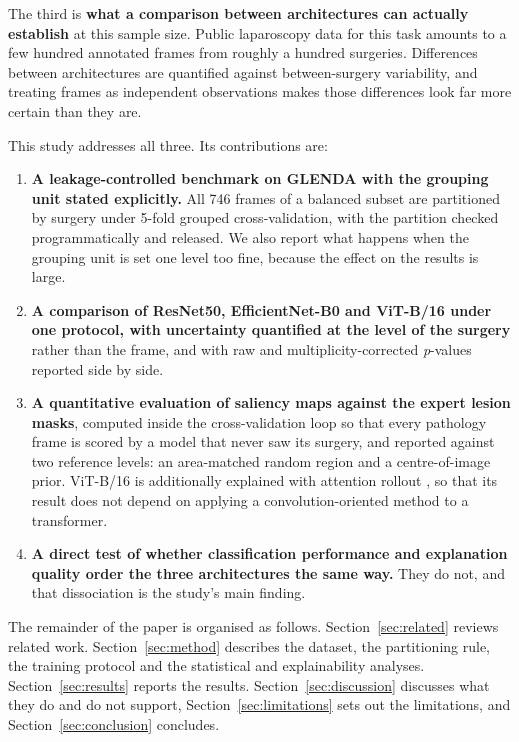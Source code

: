 \documentclass[preprint,12pt]{elsarticle}
\begin{document}
The third is \textbf{what a comparison between architectures can actually establish} at this sample size. Public laparoscopy data for this task amounts to a few hundred annotated frames from roughly a hundred surgeries. Differences between architectures are quantified against between-surgery variability, and treating frames as independent observations makes those differences look far more certain than they are.

This study addresses all three. Its contributions are:

\begin{enumerate}\item \textbf{A leakage-controlled benchmark on GLENDA with the grouping unit stated explicitly.} All 746 frames of a balanced subset are partitioned by surgery under 5-fold grouped cross-validation, with the partition checked programmatically and released. We also report what happens when the grouping unit is set one level too fine, because the effect on the results is large.\item \textbf{A comparison of ResNet50, EfficientNet-B0 and ViT-B/16 under one protocol, with uncertainty quantified at the level of the surgery} rather than the frame, and with raw and multiplicity-corrected \emph{p}-values reported side by side.\item \textbf{A quantitative evaluation of saliency maps against the expert lesion masks}, computed inside the cross-validation loop so that every pathology frame is scored by a model that never saw its surgery, and reported against two reference levels: an area-matched random region and a centre-of-image prior. ViT-B/16 is additionally explained with attention rollout \cite{ref_rollout}, so that its result does not depend on applying a convolution-oriented method to a transformer.\item \textbf{A direct test of whether classification performance and explanation quality order the three architectures the same way.} They do not, and that dissociation is the study's main finding.\end{enumerate}
The remainder of the paper is organised as follows. Section~\ref{sec:related} reviews related work. Section~\ref{sec:method} describes the dataset, the partitioning rule, the training protocol and the statistical and explainability analyses. Section~\ref{sec:results} reports the results. Section~\ref{sec:discussion} discusses what they do and do not support, Section~\ref{sec:limitations} sets out the limitations, and Section~\ref{sec:conclusion} concludes.
\end{document}
